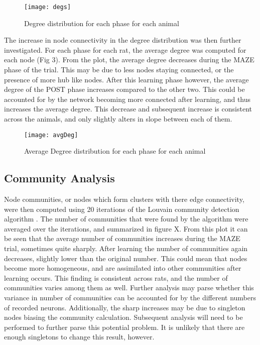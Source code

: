 \documentclass[9pt,twocolumn,twoside,lineno]{pnas-new}
\begin{document}
\begin{figure}[tbhp]
\centering
\texttt{[image: degs]}
\caption{Degree distribution for each phase for each animal}
\label{fig:degs}
\end{figure}

The increase in node connectivity in the degree distribution was then further investigated. For each phase for each rat, the average degree was computed for each node (Fig 3). From the plot, the average degree decreases during the MAZE phase of the trial. This may be due to less nodes staying connected, or the presence of more hub like nodes. After this learning phase however, the average degree of the POST phase increases compared to the other two. This could be accounted for by the network becoming more connected after learning, and thus increases the average degree. This decrease and subsequent increase is consistent across the animals, and only slightly alters in slope between each of them.

\begin{figure}[tbhp]
\centering
\texttt{[image: avgDeg]}
\caption{Average Degree distribution for each phase for each animal}
\label{fig:avgDeg}
\end{figure}



\subsection*{Community Analysis}

Node communities, or nodes which form clusters with there edge connectivity, were then computed using 20 iterations of the Louvain community detection algorithm \cite{blondel2008fast}. The number of communities that were found by the algorithm were averaged over the iterations, and summarized in figure X. From this plot it can be seen that the average number of communities increases during the MAZE trial, sometimes quite sharply. After learning the number of communities again decreases, slightly lower than the original number. This could mean that nodes become more homogeneous, and are assimilated into other communities after learning occurs. This finding is consistent across rats, and the number of communities varies among them as well. Further analysis may parse whether this variance in number of communities can be accounted for by the different numbers of recorded neurons. Additionally, the sharp increases may be due to singleton nodes biasing the community calculation. Subsequent analysis will need to be performed to further parse this potential problem. It is unlikely that there are enough singletons to change this result, however. 
\end{document}
